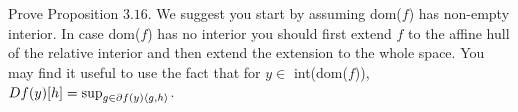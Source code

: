 \begin{exercise}[]{}
\end{exercise}
Prove Proposition $3.16$. We suggest you start
by assuming dom($f$) has non-empty interior. In case
dom($f$) has no interior you should first extend $f$ to the affine hull
of the relative interior and then extend the extension to the whole space.
You may find it useful to use the fact that for
$y \in$ int(dom($f$)), $Df(y)[h]=\sup_{g \in \partial f(y) \langle g,h\rangle}$.

\begin{solution}[TODO]
\end{solution}
